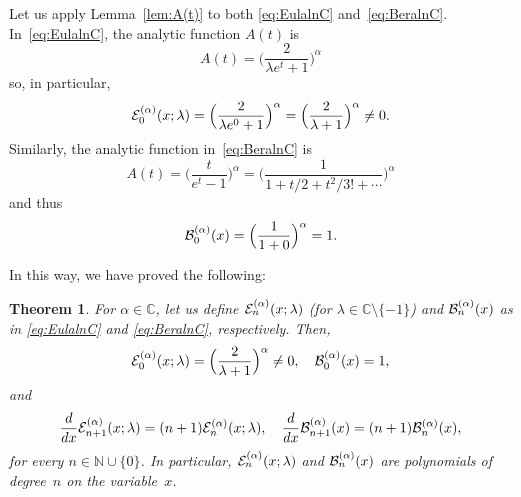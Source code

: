 \documentclass[11pt,a4paper]{amsart}
\newcommand{\N}{\mathbb{N}}
\newcommand{\C}{\mathbb{C}}
\newcommand{\B}[1][]{\mathcal{B}\ifx#1\empty\else^{(#1)}\fi}
\newcommand{\E}[1][]{\mathcal{E}\ifx#1\empty\else^{(#1)}\fi}
\theoremstyle{plain}
\newtheorem{theor}{Theorem}
\theoremstyle{plain}
\theoremstyle{plain}
\begin{document}
Let us apply Lemma~\ref{lem:A(t)} to both \eqref{eq:EulalnC} and~\eqref{eq:BeralnC}.
In~\eqref{eq:EulalnC}, the analytic function $A(t)$ is
\[
  A(t) = \Big( \frac{2}{\lambda e^t+1} \Big)^\alpha 
\]
so, in particular, 
\[
  \E[\alpha]_{0}(x;\lambda) = \Big( \frac{2}{\lambda e^0+1} \Big)^\alpha  
  = \Big( \frac{2}{\lambda+1} \Big)^\alpha \ne 0.
\]
Similarly, the analytic function in~\eqref{eq:BeralnC} is
\[
  A(t) = \Big( \frac{t}{e^t-1} \Big)^\alpha = \Big( \frac{1}{1 + t/2 + t^2/3! + \cdots} \Big)^\alpha
\]
and thus 
\[
  \B[\alpha]_{0}(x) = \Big( \frac{1}{1 + 0} \Big)^\alpha = 1.
\]

In this way, we have proved the following:

\begin{theor}
For $\alpha \in \C$, let us define $\E[\alpha]_{n}(x;\lambda)$ (for $\lambda \in \C \setminus \{-1\}$) and
$\B[\alpha]_{n}(x)$ as in \eqref{eq:EulalnC} and \eqref{eq:BeralnC}, respectively.
Then,
\[
  \E[\alpha]_{0}(x;\lambda)  
  = \Big( \frac{2}{\lambda+1} \Big)^\alpha \ne 0,
  \quad
  \B[\alpha]_{0}(x)  
  = 1,
\]
and
\[
  \frac{d}{dx} \E[\alpha]_{n+1}(x;\lambda) = (n+1) \E[\alpha]_{n}(x;\lambda),
  \quad
  \frac{d}{dx} \B[\alpha]_{n+1}(x) = (n+1) \B[\alpha]_{n}(x),
\]
for every $n \in \N \cup \{0\}$.
In particular, $\E[\alpha]_{n}(x;\lambda)$ and $\B[\alpha]_{n}(x)$ are polynomials of degree~$n$ on the variable~$x$.
\end{theor}
\end{document}
